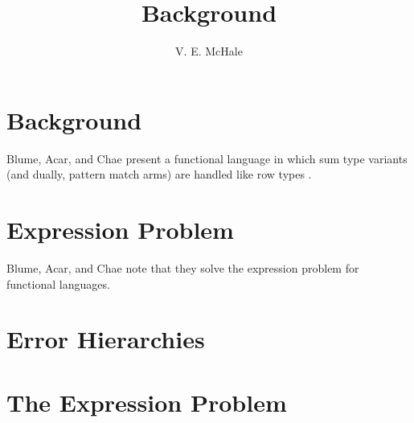 \documentclass{article}
\begin{document}
\title{Background}
\author {V. E. McHale}
\maketitle

\tableofcontents


\section{Background}

Blume, Acar, and Chae present a functional language in which sum type variants (and dually, pattern match arms) are handled like row types \cite{blume2006}.


\section{Expression Problem}

Blume, Acar, and Chae note that they solve the expression problem for functional languages.






\section{Error Hierarchies}





\appendix

\section{The Expression Problem}
\end{document}
